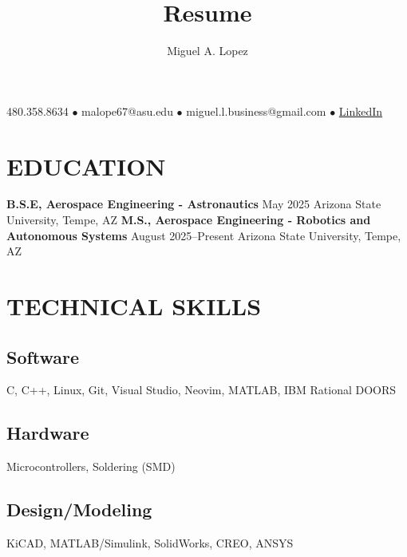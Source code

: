 \documentclass{article}
\makeatletter
\renewcommand{\maketitle}{
	\begin{center}
		{\huge\bfseries
			\theauthor}
		
		480.358.8634 $\bullet$ malope67@asu.edu $\bullet$ miguel.l.business@gmail.com $\bullet$ \href{https://www.linkedin.com/in/miguel-lopez-242628a2/}{LinkedIn}
	\end{center}
}
\makeatother
\begin{document}
	
	\title{Resume}
	\author{Miguel A. Lopez}
	\maketitle
	\section{EDUCATION}
	\textbf{B.S.E, Aerospace Engineering - Astronautics}
	\hfill 
	May 2025
	\linebreak
	Arizona State University, Tempe, AZ 
	\hfill
	\vspace*{5px}
	\newline
	\noindent
	\textbf{M.S., Aerospace Engineering - Robotics and Autonomous Systems}
	\hfill 
	August 2025--Present
	\linebreak
	Arizona State University, Tempe, AZ 
	\hfill
	
	\section{TECHNICAL SKILLS}
	\subsection{Software} 
	C, C++, Linux, Git, Visual Studio, Neovim, MATLAB, IBM Rational DOORS
	\subsection{Hardware}
	Microcontrollers, Soldering (SMD)
	\subsection{Design/Modeling}
	KiCAD, MATLAB/Simulink, SolidWorks, CREO, ANSYS 
	
	
\end{document}
